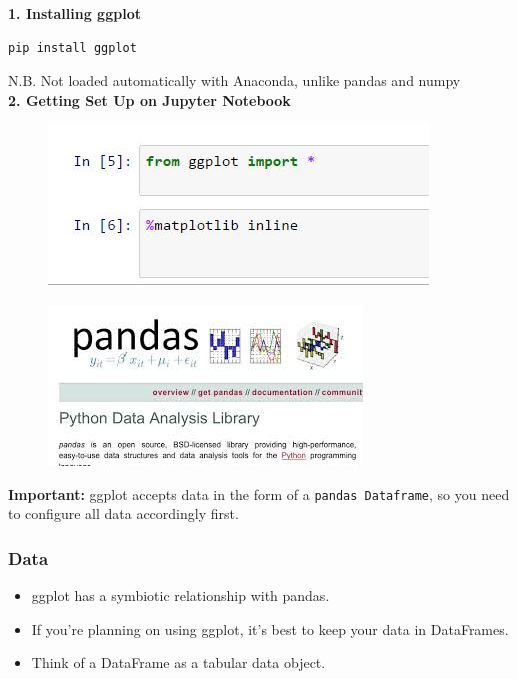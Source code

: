 \documentclass{beamer}
\begin{document}
\begin{frame}[fragile]
\textbf{1. Installing ggplot}
\begin{framed}
\begin{verbatim}
pip install ggplot
\end{verbatim}
\end{framed}
N.B. Not loaded automatically with Anaconda, unlike pandas and numpy\\
\bigskip
\textbf{2. Getting Set Up on Jupyter Notebook}
\begin{figure}
\centering
\includegraphics[width=0.7\linewidth]{jupyter1}
\end{figure}

\end{frame}
\begin{frame}
	\Large
	\begin{figure}
\centering
\includegraphics[width=0.7\linewidth]{pandas}
\end{figure}

	\textbf{Important:} ggplot accepts data in the form of a \texttt{pandas Dataframe}, so you need to configure all data accordingly first.
\end{frame}
\begin{frame}[fragile]
	\frametitle{Data}
	\Large
	\begin{itemize}
		\item ggplot has a symbiotic relationship with pandas. 
		\item If you're planning on using ggplot, it's best to keep your data in DataFrames. 
		\item Think of a DataFrame as a tabular data object. 
	\end{itemize}
\end{frame}
\end{document}
